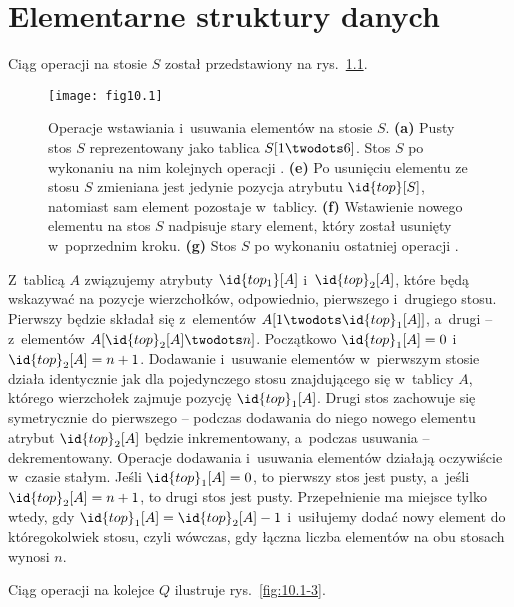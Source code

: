\chapter{Elementarne struktury danych}


\exercise %
Ciąg operacji na stosie $S$ został przedstawiony na rys.~\ref{fig:10.1-1}.
\begin{figure}[ht]
	\begin{center}
		\texttt{[image: fig10.1]}
	\end{center}
	\caption{Operacje wstawiania i~usuwania elementów na stosie $S$. {\sffamily\bfseries(a)} Pusty stos $S$ reprezentowany jako tablica $S[1\twodots6]$. {\sffamily\bfseries{}} Stos $S$ po wykonaniu na nim kolejnych operacji . {\sffamily\bfseries(e)} Po usunięciu elementu ze stosu $S$ zmieniana jest jedynie pozycja atrybutu $\id{top}[S]$, natomiast sam element pozostaje w~tablicy. {\sffamily\bfseries(f)} Wstawienie nowego elementu na stos $S$ nadpisuje stary element, który został usunięty w~poprzednim kroku. {\sffamily\bfseries(g)} Stos $S$ po wykonaniu ostatniej operacji .} \label{fig:10.1-1}
\end{figure}

\exercise %
Z~tablicą $A$ związujemy atrybuty $\id{top_1}[A]$ i~$\id{top}_2[A]$, które będą wskazywać na pozycje wierzchołków, odpowiednio, pierwszego i~drugiego stosu. Pierwszy będzie składał się z~elementów $A[1\twodots\id{top}_1[A]]$, a~drugi -- z~elementów $A[\id{top}_2[A]\twodots n]$. Początkowo $\id{top}_1[A]=0$ i~$\id{top}_2[A]=n+1$. Dodawanie i~usuwanie elementów w~pierwszym stosie działa identycznie jak dla pojedynczego stosu znajdującego się w~tablicy $A$, którego wierzchołek zajmuje pozycję $\id{top}_1[A]$. Drugi stos zachowuje się symetrycznie do pierwszego -- podczas dodawania do niego nowego elementu atrybut $\id{top}_2[A]$ będzie inkrementowany, a~podczas usuwania -- dekrementowany. Operacje dodawania i~usuwania elementów działają oczywiście w~czasie stałym. Jeśli $\id{top}_1[A]=0$, to pierwszy stos jest pusty, a~jeśli $\id{top}_2[A]=n+1$, to drugi stos jest pusty. Przepełnienie ma miejsce tylko wtedy, gdy $\id{top}_1[A]=\id{top}_2[A]-1$ i~usiłujemy dodać nowy element do któregokolwiek stosu, czyli wówczas, gdy łączna liczba elementów na obu stosach wynosi $n$.

\exercise %
Ciąg operacji na kolejce $Q$ ilustruje rys.~\ref{fig:10.1-3}.

